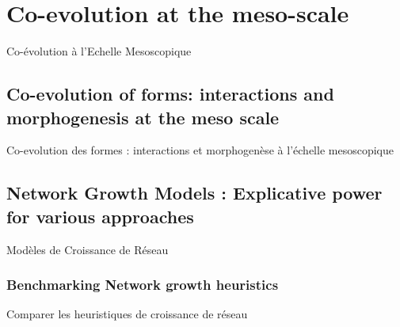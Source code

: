 

\chapter{Co-evolution at the meso-scale}{Co-évolution à l'Echelle Mesoscopique}

\label{ch:mesocoevolution} 















\newpage

\section[Co-evolution at the meso scale][Co-évolution à l'échelle mesoscopique]{Co-evolution of forms: interactions and morphogenesis at the meso scale}{Co-evolution des formes : interactions et morphogenèse à l'échelle mesoscopique}














\newpage

\section[Network Growth Models]{Network Growth Models : Explicative power for various approaches}{Modèles de Croissance de Réseau}

\subsection{Benchmarking Network growth heuristics}{Comparer les heuristiques de croissance de réseau}


